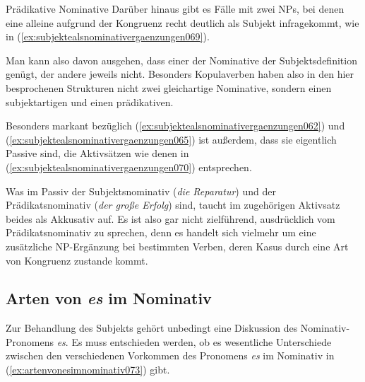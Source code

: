 \begin{Vertiefung}{Prädikative Nominative}
Darüber hinaus gibt es Fälle mit zwei NPs, bei denen eine alleine aufgrund der Kongruenz recht deutlich als Subjekt infragekommt, wie in (\ref{ex:subjektealsnominativergaenzungen069}).

\begin{exe}
\end{exe}

Man kann also davon ausgehen, dass einer der Nominative der Subjektsdefinition genügt, der andere jeweils nicht.
Besonders Kopulaverben haben also in den hier besprochenen Strukturen nicht zwei gleichartige Nominative, sondern einen subjektartigen und einen prädikativen.

Besonders markant bezüglich (\ref{ex:subjektealsnominativergaenzungen062}) und (\ref{ex:subjektealsnominativergaenzungen065}) ist außerdem, dass sie eigentlich Passive sind, die Aktivsätzen wie denen in (\ref{ex:subjektealsnominativergaenzungen070}) entsprechen.

\begin{exe}
  \ex\label{ex:subjektealsnominativergaenzungen070}
  \begin{xlist}
  \end{xlist}
\end{exe}

Was im Passiv der Subjektsnominativ (\textit{die Reparatur}) und der Prädikatsnominativ (\textit{der große Erfolg}) sind, taucht im zugehörigen Aktivsatz beides als Akkusativ auf.
Es ist also gar nicht zielführend, ausdrücklich vom Prädikatsnominativ zu sprechen, denn es handelt sich vielmehr um eine zusätzliche NP-Ergänzung bei bestimmten Verben, deren Kasus durch eine Art von Kongruenz zustande kommt.

\end{Vertiefung}


\subsection{Arten von \textit{es} im Nominativ}
\label{sec:artenvonesimnominativ}

Zur Behandlung des Subjekts gehört unbedingt eine Diskussion des Nominativ-Pronomens \textit{es}.
Es muss entschieden werden, ob es wesentliche Unterschiede zwischen den verschiedenen Vorkommen des Pronomens \textit{es} im Nominativ in (\ref{ex:artenvonesimnominativ073}) gibt.

